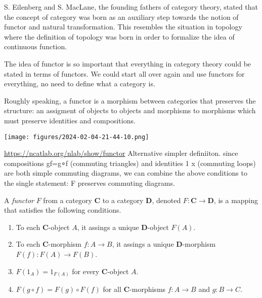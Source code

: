 S. Eilenberg and S. MacLane, the founding fathers of category theory, stated that the concept of category was born as an auxiliary step towards the notion of functor and natural transformation.  This resembles the situation in topology where the definition of topology was born in order to formalize the idea of continuous function.

The idea of functor is so important that everything in category theory could be stated in terms of functors. We could start all over again and use functors for everything, no need to define what a category is.

Roughly speaking, a functor is a morphism between categories that preserves the structure: an assigment of  objects to objects and morphisms to morphisms which must preserve identities and compositions. 

\begin{marginfigure}
    \centering
    \texttt{[image: figures/2024-02-04-21-44-10.png]}
    \caption{\url{https://ncatlab.org/nlab/show/functor} Alternative simpler definiiton.  since compositions gf=g∘f (commuting triangles) and identities 1 x (commuting loops) are both simple commuting diagrams, we can combine the above conditions to the single statement:    F preserves commuting diagrams.}%
\end{marginfigure}

\begin{definition}[Functor]
A \textit{functor} \(F\) from a category \(\mathbf{C}\) to a category \(\mathbf{D}\), denoted \(F\colon \mathbf{C} \to \mathbf{D}\),  is a mapping that satisfies the following conditions. 
\begin{enumerate}[label=(\roman*),left=-2mm]
    \item To each \(\mathbf{C}\)-object \(A\), it assings a unique \(\mathbf{D}\)-object \(F(A)\).
    \item To each \(\mathbf{C}\)-morphism \(f\colon A\to B\), it assings a unique \(\mathbf{D}\)-morphism \(F(f)\colon F(A)\to  F(B)\).
    \item \(F(1_A) = 1_{F(A)}\) for every \(\mathbf{C}\)-object \(A\).
    \item \(F(g\circ f) = F(g) \circ F(f)\) for all \(\mathbf{C}\)-morphisms \(f\colon A\to B\) and \(g\colon B\to C\).
\end{enumerate}
\end{definition}

